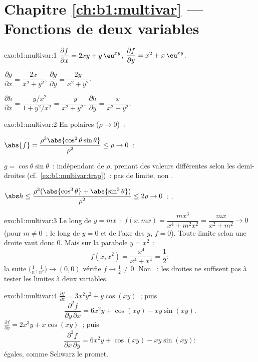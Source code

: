 \section*{Chapitre \ref{ch:b1:multivar} --- Fonctions de deux variables}

\begin{solution}{exo:b1:multivar:1}
$\dfrac{\partial f}{\partial x} = 2xy + y\,\eu^{xy}$,
$\dfrac{\partial f}{\partial y} = x^2 + x\,\eu^{xy}$.

$\dfrac{\partial g}{\partial x} = \dfrac{2x}{x^2+y^2}$,
$\dfrac{\partial g}{\partial y} = \dfrac{2y}{x^2+y^2}$.

$\dfrac{\partial h}{\partial x} = \dfrac{-y/x^2}{1 + y^2/x^2} =
\dfrac{-y}{x^2+y^2}$,
$\dfrac{\partial h}{\partial y} = \dfrac{x}{x^2+y^2}$.
\end{solution}

\begin{solution}{exo:b1:multivar:2}
En  polaires ($\rho \to 0$)~:

$\abs{f} = \dfrac{\rho^3\abs{\cos^2\theta\sin\theta}}{\rho^2} \leq
\rho \to 0$~: .

$g = \cos\theta\sin\theta$~: indépendant de $\rho$, prenant des
valeurs différentes selon les demi-droites (cf.\
\cref{ex:b1:multivar:trap})~: pas de limite, non .

$\abs h \leq \dfrac{\rho^3(\abs{\cos^3\theta} +
\abs{\sin^3\theta})}{\rho^2} \leq 2\rho \to 0$~: .
\end{solution}

\begin{solution}{exo:b1:multivar:3}
Le long de $y = mx$~: $f(x, mx) = \dfrac{m x^3}{x^4 + m^2 x^2} =
\dfrac{mx}{x^2 + m^2} \to 0$ (pour $m \neq 0$~; le long de $y = 0$
et de l'axe des $y$, $f = 0$). Toute limite selon une droite vaut
donc $0$. Mais sur la parabole $y = x^2$~:
\[
f(x, x^2) = \frac{x^4}{x^4 + x^4} = \frac12 :
\]
la suite $\bigl(\frac1n, \frac{1}{n^2}\bigr) \to (0,0)$ vérifie
$f \to \frac12 \neq 0$. Non ~: les droites ne suffisent pas
à tester les limites à deux variables.
\end{solution}

\begin{solution}{exo:b1:multivar:4}
$\frac{\partial f}{\partial x} = 3x^2y^2 + y\cos(xy)$~; puis
\[
\frac{\partial^2 f}{\partial y\,\partial x}
= 6x^2 y + \cos(xy) - xy\sin(xy) .
\]
$\frac{\partial f}{\partial y} = 2x^3 y + x\cos(xy)$~; puis
\[
\frac{\partial^2 f}{\partial x\,\partial y}
= 6x^2 y + \cos(xy) - xy\sin(xy) :
\]
égales, comme Schwarz le promet.
\end{solution}

